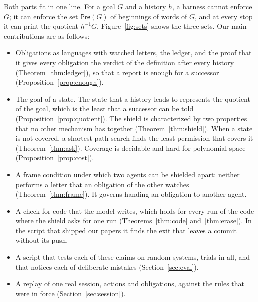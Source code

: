 \documentclass[acmsmall,nonacm,screen]{acmart}
\newcommand{\kw}[1]{\mathsf{#1}}
\newcommand{\pre}[1]{\kw{Pre}(#1)}
\begin{document}
Both parts fit in one line. For a goal $G$ and a history $h$, a harness cannot enforce $G$;
it can enforce the set $\pre{G}$ of beginnings of words of $G$, and at every stop it can
print the quotient $h^{-1}G$. Figure~\ref{fig:sets} shows the three sets. Our main
contributions are as follows:
\begin{itemize}
\item Obligations as languages with watched letters, the ledger, and the proof that it gives
  every obligation the verdict of the definition after every history
  (Theorem~\ref{thm:ledger}), so that a report is enough for a successor
  (Proposition~\ref{prop:enough}).
\item The goal of a state. The state that a history leads to represents the quotient of the
  goal, which is the least that a successor can be told (Proposition~\ref{prop:quotient}).
  The shield is characterized by two properties that no other mechanism has together
  (Theorem~\ref{thm:shield}). When a state is not covered, a shortest-path search finds the
  least permission that covers it (Theorem~\ref{thm:ask}). Coverage is decidable and hard
  for polynomial space (Proposition~\ref{prop:cost}).
\item A frame condition under which two agents can be shielded apart: neither performs a
  letter that an obligation of the other watches (Theorem~\ref{thm:frame}). It governs
  handing an obligation to another agent.
\item A check for code that the model writes, which holds for every run of the code where
  the shield asks for one run (Theorems~\ref{thm:code} and~\ref{thm:erase}). In the script
  that shipped our papers it finds the exit that leaves a commit without its push.
\item A script that tests each of these claims on random systems, \exTrials{} trials in
  all, and that notices each of \exMutants{} deliberate mistakes
  (Section~\ref{sec:eval}).
\item A replay of one real session, \exSessionLetters{} actions and
  \exSessionObligations{} obligations, against the rules that were in force
  (Section~\ref{sec:session}).
\end{itemize}
\end{document}
